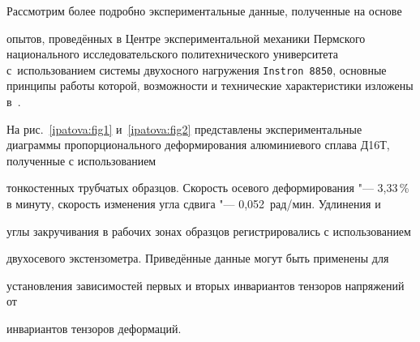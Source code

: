 Рассмотрим более подробно экспериментальные данные, полученные на основе

опытов, проведённых в Центре экспериментальной механики Пермского национального исследовательского политехнического университета с~использованием системы двухосного нагружения {\tt Instron 8850}, основные принципы работы которой, возможности и технические характеристики изложены в~\cite{ipatova:bib3,ipatova:bib18,ipatova:bib19}.



На рис.~\ref{ipatova:fig1} и~\ref{ipatova:fig2} представлены экспериментальные диаграммы пропорционального деформирования алюминиевого сплава Д16Т, полученные с использованием

тонкостенных трубчатых образцов. Скорость осевого деформирования "--- 3,33\,\% в минуту, скорость изменения угла сдвига "--- 0,052~рад/мин. Удлинения и

углы закручивания в рабочих зонах образцов регистрировались с использованием

двухосевого экстензометра. Приведённые данные могут быть применены для

установления зависимостей первых и вторых инвариантов тензоров напряжений от

инвариантов тензоров деформаций.




